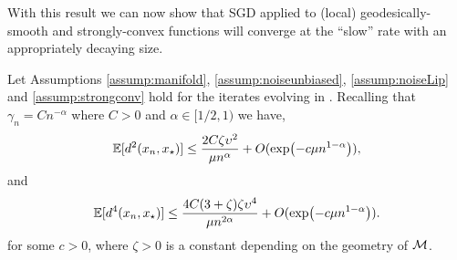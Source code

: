 With this result we can now show that SGD applied to (local) geodesically-smooth and strongly-convex functions will converge at the ``slow'' rate
with an appropriately decaying size.
\begin{proposition}\label{prop:mom2}
Let Assumptions \ref{assump:manifold}, \ref{assump:noiseunbiased},  \ref{assump:noiseLip} and \ref{assump:strongconv}
  hold for the iterates evolving in  . Recalling that $\gamma_n=Cn^{-\alpha}$ where $C>0$ and $\alpha\in[1/2,1)$ we have,
\[
\mathbb{E}[d^2(x_{n},x_\star)]\leq \frac{2C  \zeta \upsilon^2}{\mu n^\alpha } + O( \exp(-c\mu n^{1-\alpha} )),
\]
and
\[
\mathbb{E}[d^4(x_{n},x_\star)]\leq\frac{4C(3+\zeta)\zeta\upsilon^4}{\mu n^{2\alpha} } + O( \exp(-c\mu n^{1-\alpha} )).
\]
for some $c > 0$, where $\zeta > 0$ is a constant depending on the geometry of $\mathcal{M}$.
\end{proposition}
